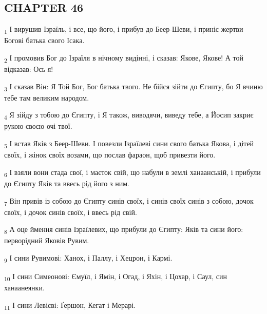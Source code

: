 \subsection{CHAPTER 46}
\begin{tcolorbox}
\textsubscript{1} І вирушив Ізраїль, і все, що його, і прибув до Беер-Шеви, і приніс жертви Богові батька свого Ісака.
\end{tcolorbox}
\begin{tcolorbox}
\textsubscript{2} І промовив Бог до Ізраїля в нічному видінні, і сказав: Якове, Якове! А той відказав: Ось я!
\end{tcolorbox}
\begin{tcolorbox}
\textsubscript{3} І сказав Він: Я Той Бог, Бог батька твого. Не бійся зійти до Єгипту, бо Я вчиню тебе там великим народом.
\end{tcolorbox}
\begin{tcolorbox}
\textsubscript{4} Я зійду з тобою до Єгипту, і Я також, виводячи, виведу тебе, а Йосип закриє рукою своєю очі твої.
\end{tcolorbox}
\begin{tcolorbox}
\textsubscript{5} І встав Яків з Беер-Шеви. І повезли Ізраїлеві сини свого батька Якова, і дітей своїх, і жінок своїх возами, що послав фараон, щоб привезти його.
\end{tcolorbox}
\begin{tcolorbox}
\textsubscript{6} І взяли вони стада свої, і маєток свій, що набули в землі ханаанській, і прибули до Єгипту Яків та ввесь рід його з ним.
\end{tcolorbox}
\begin{tcolorbox}
\textsubscript{7} Він привів із собою до Єгипту синів своїх, і синів своїх синів з собою, дочок своїх, і дочок синів своїх, і ввесь рід свій.
\end{tcolorbox}
\begin{tcolorbox}
\textsubscript{8} А оце ймення синів Ізраїлевих, що прибули до Єгипту: Яків та сини його: перворідний Яковів Рувим.
\end{tcolorbox}
\begin{tcolorbox}
\textsubscript{9} І сини Рувимові: Ханох, і Паллу, і Хецрон, і Кармі.
\end{tcolorbox}
\begin{tcolorbox}
\textsubscript{10} І сини Симеонові: Ємуїл, і Ямін, і Огад, і Яхін, і Цохар, і Саул, син ханаанеянки.
\end{tcolorbox}
\begin{tcolorbox}
\textsubscript{11} І сини Левієві: Ґершон, Кегат і Мерарі.
\end{tcolorbox}
